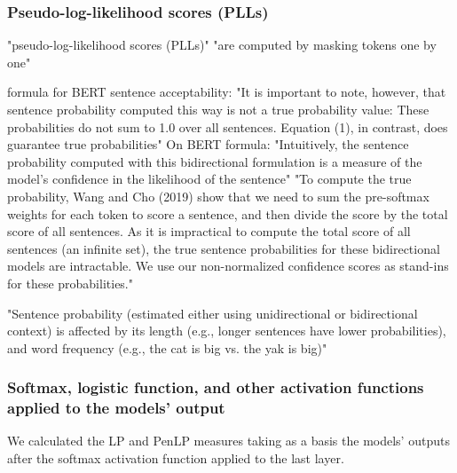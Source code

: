 \subsubsection{Pseudo-log-likelihood scores (PLLs)}


"pseudo-log-likelihood scores (PLLs)" "are computed by masking tokens one by one" \citep{salazar2020masked}

\citet{lau2020furiously} formula for BERT sentence acceptability:
"It is important to note, however, that sentence probability computed this way is not a true probability value: These probabilities do
not sum to 1.0 over all sentences. Equation (1), in contrast, does guarantee true probabilities" \citep{lau2020furiously}
On BERT formula:
"Intuitively, the sentence probability computed with this bidirectional formulation is a measure of the model’s confidence in the likelihood of the
sentence"\citep{lau2020furiously}
"To compute the true probability, Wang and Cho (2019) show that we need to sum the pre-softmax weights for each token to score a
sentence, and then divide the score by the total
score of all sentences. As it is impractical to
compute the total score of all sentences (an
infinite set), the true sentence probabilities for
these bidirectional models are intractable. We use
our non-normalized confidence scores as stand-ins
for these probabilities."\citep{lau2020furiously}

"Sentence probability (estimated either using
unidirectional or bidirectional context) is affected
by its length (e.g., longer sentences have lower
probabilities), and word frequency (e.g., the cat is
big vs. the yak is big)" \citep{lau2020furiously}


\subsubsection{Softmax, logistic function, and other activation functions applied to the models' output}
\label{sec:softmax}
We calculated the LP and PenLP measures taking as a basis the models' outputs after the softmax activation function applied to the last layer. 

